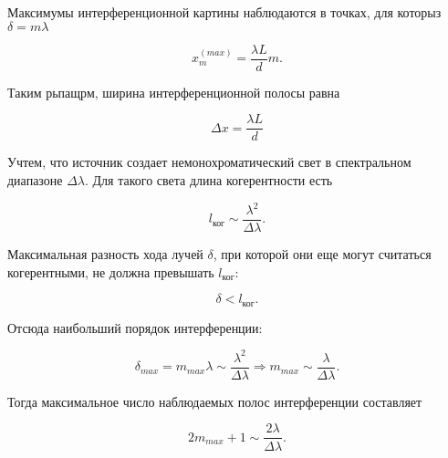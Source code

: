 Максимумы интерференционной картины наблюдаются в точках, для которыз $\delta = m\lambda$

\begin{equation*}
    x_m^{(max)} = \frac{\lambda L}{d}m.
\end{equation*}

Таким рьпащрм, ширина интерференционной полосы равна

\begin{equation*}
    \Delta x = \frac{\lambda L}{d}
\end{equation*}

Учтем, что источник создает немонохроматический свет в спектральном диапазоне $\Delta \lambda$. Для такого света длина когерентности есть

\begin{equation*}
    l_{\text{ког}} \sim \frac{\lambda^2}{\Delta \lambda}.
\end{equation*}

Максимальная разность хода лучей $\delta$, при которой они еще могут считаться когерентными, не должна превышать $l_{\text{ког}}$:

\begin{equation*}
    \delta < l_{\text{ког}}.
\end{equation*}

Отсюда наибольший порядок интерференции:

\begin{equation*}
    \delta_{max} = m_{max} \lambda \sim \frac{\lambda^2}{\Delta \lambda}  \Rightarrow m_{max} \sim \frac{\lambda}{\Delta\lambda}.
\end{equation*}

Тогда максимальное число наблюдаемых полос интерференции составляет

\begin{equation*}
    2m_{max}+1 \sim \frac{2\lambda}{\Delta\lambda}.
\end{equation*}

